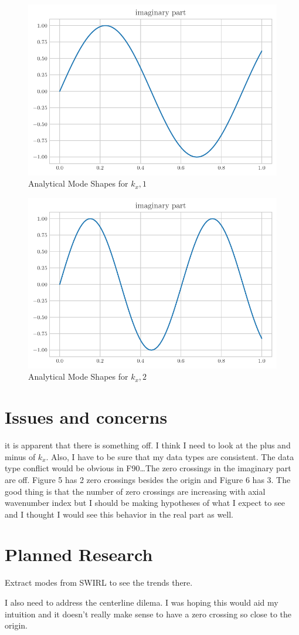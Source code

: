 \documentclass[a4paper]{article}
\begin{document}
 \begin{figure}[h!]
     \centering
     \includegraphics{k_x_1_im.pdf}
     \caption{Analytical Mode Shapes for $k_x,1$}
 \end{figure}
 \begin{figure}[h!]
     \centering
     \includegraphics{k_x_2_im.pdf}
     \caption{Analytical Mode Shapes for $k_x,2$}
 \end{figure}

\section{Issues and concerns}
it is apparent that there is something off. I think I need to look at the plus and minus 
of $k_x$. Also, I have to be sure that my data types are consistent. The data type
conflict would be obvious in F90\dots The zero crossings in the imaginary part are off.
Figure 5 has 2 zero crossings besides the origin and Figure 6 has 3. The good thing
is that the number of zero crossings are increasing with axial wavenumber index
but I should be making hypotheses of what I expect to see and I thought I would 
see this behavior in the real part as well. 

\section{Planned Research}
Extract modes from SWIRL to see the trends there. 

I also need to address the centerline dilema. I was hoping this would aid my intuition
and it doesn't really make sense to have a zero crossing so close to the origin.
\end{document}
